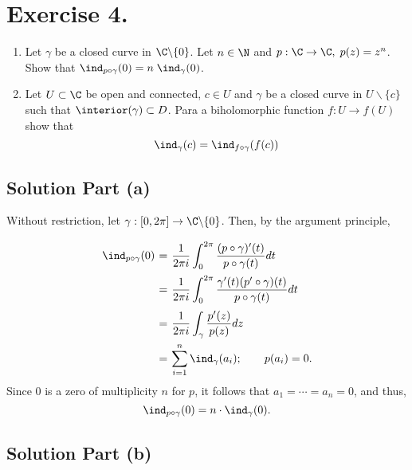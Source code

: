 \section*{Exercise 4.}

\begin{enumerate}[label=(\alph*)]
    \item Let $\gamma$ be a closed curve in $\C \backslash \{0\}$. Let $n\in \N$ and $p: \C\to \C,\; p(z) = z^n$. Show that $\ind_{p\circ \gamma}(0) = n\; \ind_\gamma(0)$.
    \item Let $U\subset \C$ be open and connected, $c\in U$ and $\gamma$ be a closed curve in $U \backslash \{c\}$ such that $\interior(\gamma) \subset D$. Para a biholomorphic function $f: U \to f(U)$ show that
    \[ \ind_\gamma(c) = \ind_{f\circ \gamma}(f(c)) \]
\end{enumerate}

\subsection*{Solution Part (a)}

Without restriction, let $\gamma : [0,2\pi] \to \C \backslash \{0\}$. Then, by the argument principle,
\[ \everymath{\displaystyle}
\arraycolsep=1.8pt\def\arraystretch{2.5}
\begin{array}{rcl}
    \ind_{p\circ\gamma}(0) & = & \frac{1}{2\pi i} \int_{0}^{2\pi} \frac{(p\circ \gamma)'(t)}{p\circ \gamma(t)} dt\\
    & = & \frac{1}{2\pi i} \int_{0}^{2\pi} \frac{\gamma'(t)(p'\circ \gamma)(t)}{p\circ \gamma(t)} dt\\
    & = & \frac{1}{2\pi i} \int_{\gamma} \frac{p'(z)}{p(z)} dz\\
    & = & \sum_{i = 1}^{n} \ind_\gamma(a_i);\hspace{2em}  p(a_i) = 0.
\end{array} \]
Since $0$ is a zero of multiplicity $n$ for $p$, it follows that $a_1 = \cdots = a_n = 0$, and thus,
\[ \ind_{p\circ\gamma}(0) = n \cdot \ind_\gamma(0). \]

\subsection*{Solution Part (b)}

